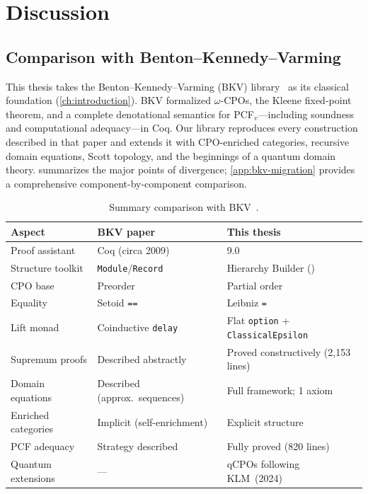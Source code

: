 
\chapter{Discussion}
\label{ch:discussion}

\section{Comparison with Benton--Kennedy--Varming}
\label{sec:disc-bkv}

This thesis takes the Benton--Kennedy--Varming (BKV)
library~\cite{BKV2009} as its classical foundation
(\cref{ch:introduction}).
BKV formalized $\omega$-CPOs, the Kleene fixed-point theorem, and a
complete denotational semantics for PCF$_v$---including soundness and
computational adequacy---in Coq.
Our library reproduces every construction described in that paper and
extends it with CPO-enriched categories, recursive domain equations,
Scott topology, and the beginnings of a quantum domain theory.
 summarizes the major points of divergence;
\cref{app:bkv-migration} provides a comprehensive component-by-component
comparison.

\begin{table}[ht]
\centering
\caption{Summary comparison with BKV~\cite{BKV2009}.}
\label{tab:bkv-summary}
\small
\begin{tabular}{@{}l l l@{}}
\toprule
\textbf{Aspect} & \textbf{BKV paper} & \textbf{This thesis} \\
\midrule
Proof assistant    & Coq (circa 2009)
                   & \Rocq{} 9.0 \\
Structure toolkit  & \texttt{Module}/\texttt{Record}
                   & Hierarchy Builder (\HB{}) \\
CPO base           & Preorder
                   & Partial order \\
Equality           & Setoid \texttt{==}
                   & Leibniz \texttt{=} \\
Lift monad         & Coinductive \texttt{delay}
                   & Flat \texttt{option} + \texttt{ClassicalEpsilon} \\
Supremum proofs    & Described abstractly
                   & Proved constructively (2{,}153 lines) \\
Domain equations   & Described (approx.\ sequences)
                   & Full framework; 1 axiom \\
Enriched categories & Implicit (self-enrichment)
                   & Explicit \HB{} structure \\
PCF adequacy       & Strategy described
                   & Fully proved (820 lines) \\
Quantum extensions & ---
                   & qCPOs following KLM~(2024) \\
\bottomrule
\end{tabular}
\end{table}

